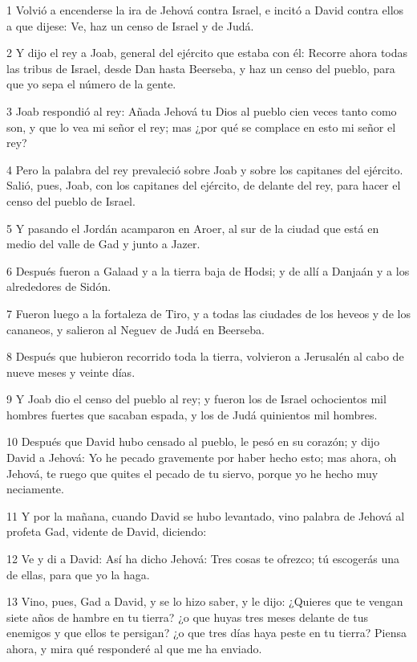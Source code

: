 \par 1 Volvió a encenderse la ira de Jehová contra Israel, e incitó a David contra ellos a que dijese: Ve, haz un censo de Israel y de Judá.
\par 2 Y dijo el rey a Joab, general del ejército que estaba con él: Recorre ahora todas las tribus de Israel, desde Dan hasta Beerseba, y haz un censo del pueblo, para que yo sepa el número de la gente.
\par 3 Joab respondió al rey: Añada Jehová tu Dios al pueblo cien veces tanto como son, y que lo vea mi señor el rey; mas ¿por qué se complace en esto mi señor el rey?
\par 4 Pero la palabra del rey prevaleció sobre Joab y sobre los capitanes del ejército. Salió, pues, Joab, con los capitanes del ejército, de delante del rey, para hacer el censo del pueblo de Israel.
\par 5 Y pasando el Jordán acamparon en Aroer, al sur de la ciudad que está en medio del valle de Gad y junto a Jazer.
\par 6 Después fueron a Galaad y a la tierra baja de Hodsi; y de allí a Danjaán y a los alrededores de Sidón.
\par 7 Fueron luego a la fortaleza de Tiro, y a todas las ciudades de los heveos y de los cananeos, y salieron al Neguev de Judá en Beerseba.
\par 8 Después que hubieron recorrido toda la tierra, volvieron a Jerusalén al cabo de nueve meses y veinte días.
\par 9 Y Joab dio el censo del pueblo al rey; y fueron los de Israel ochocientos mil hombres fuertes que sacaban espada, y los de Judá quinientos mil hombres.
\par 10 Después que David hubo censado al pueblo, le pesó en su corazón; y dijo David a Jehová: Yo he pecado gravemente por haber hecho esto; mas ahora, oh Jehová, te ruego que quites el pecado de tu siervo, porque yo he hecho muy neciamente.
\par 11 Y por la mañana, cuando David se hubo levantado, vino palabra de Jehová al profeta Gad, vidente de David, diciendo:
\par 12 Ve y di a David: Así ha dicho Jehová: Tres cosas te ofrezco; tú escogerás una de ellas, para que yo la haga.
\par 13 Vino, pues, Gad a David, y se lo hizo saber, y le dijo: ¿Quieres que te vengan siete años de hambre en tu tierra? ¿o que huyas tres meses delante de tus enemigos y que ellos te persigan? ¿o que tres días haya peste en tu tierra? Piensa ahora, y mira qué responderé al que me ha enviado.
